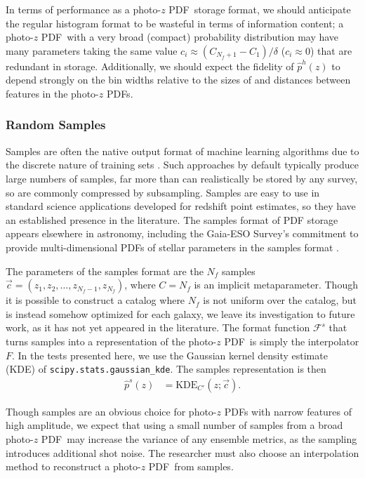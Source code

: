 \documentclass[\docopts]{\docclass}
\newcommand{\pz}{photo-$z$ PDF}
\begin{document}
In terms of performance as a \pz\ storage format, we should anticipate the 
regular histogram format to be wasteful in terms of information content; a \pz\ 
with a very broad (compact) probability distribution may have many parameters 
taking the same value $c_{i} \approx (C_{N_{f}+1} - C_{1}) / \delta$ 
($c_{i}\approx0$) that are redundant in storage.
Additionally, we should expect the fidelity of $\hat{p}^{h}(z)$ to depend 
strongly on the bin widths relative to the sizes of and distances between 
features in the \pz s.

\subsubsection{Random Samples}
\label{sec:samples}

Samples are often the native output format of machine learning algorithms due 
to the discrete nature of training sets \citep{de_vicente_dnf_2016}.
Such approaches by default typically produce large numbers of samples, far more 
than can realistically be stored by any survey, so are commonly compressed by 
subsampling\citep{hoyle_dark_2017}.
Samples are easy to use in standard science applications developed for redshift 
point estimates, so they have an established presence in the 
literature\citep{bonnett_redshift_2016}.
The samples format of PDF storage appears elsewhere in astronomy, including the 
Gaia-ESO Survey's commitment to provide multi-dimensional PDFs of stellar 
parameters in the samples format \citep{bailer-jones_gaia_2013}.

The parameters of the samples format are the $N_{f}$ samples $\vec{c}=(z_{1}, 
z_{2}, \dots, z_{N_{f}-1}, z_{N_{f}})$, where $C=N_{f}$ is an implicit 
metaparameter.
Though it is possible to construct a catalog where $N_{f}$ is not uniform over 
the catalog, but is instead somehow optimized for each galaxy, we leave its 
investigation to future work, as it has not yet appeared in the literature.
The format function $\mathcal{F}^{s}$ that turns samples into a representation 
of the \pz\ is simply the interpolator $F$.
In the tests presented here, we use the Gaussian kernel density estimate (KDE) 
of \texttt{scipy.stats.gaussian\_kde}.
The samples representation is then
\begin{align}
  \label{eq:sampled}
  \hat{p}^{s}(z) &= \mathrm{KDE}_{C'}(z; \vec{c}).
\end{align}

Though samples are an obvious choice for \pz s with narrow features of high 
amplitude, we expect that using a small number of samples from a broad \pz\ may 
increase the variance of any ensemble metrics, as the sampling introduces 
additional shot noise.
The researcher must also choose an interpolation method to reconstruct a \pz\ 
from samples.
\end{document}
